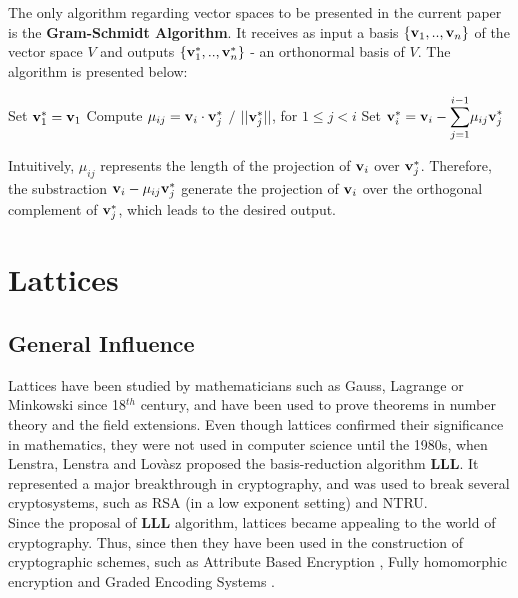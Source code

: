 \begin{enumerate}
	The only algorithm regarding vector spaces to be presented in the current paper is the  \textbf{Gram-Schmidt Algorithm}. It receives as input a basis $\{\textbf{v}_1, .., \textbf{v}_n\}$ of the vector space $V$ and outputs $\{\textbf{v}_1^*,..,\textbf{v}_n^*\}$ - an orthonormal basis of $V$. The algorithm is presented below:

\begin{tcolorbox}[colframe=black,colback=white,arc=0pt,outer arc=0pt]
	\begin{algorithmic}[1]
		\State Set $\textbf{v}_1^* = \textbf{v}_1$
		\State Compute $\mu_{ij} = \textbf{v}_i \cdot \textbf{v}_j^*$ $/$ $ ||\textbf{v}_j^*||$,  for $1 \leq j < i$
		\State Set $\textbf{v}_i^* = \textbf{v}_i - \displaystyle{\sum_{j = 1}^{i-1}} \mu_{ij} \textbf{v}_j^* $
		\EndFor
	\end{algorithmic}
\end{tcolorbox}

	Intuitively, $\mu_{ij}$ represents the length of the projection of $\textbf{v}_i$ over $\textbf{v}_j^*$. Therefore, the substraction $\textbf{v}_i - \mu_{ij} \textbf{v}_j^*$ generate the projection of $\textbf{v}_i$ over the orthogonal complement of $\textbf{v}_j^*$, which leads to the desired output. 
\end{enumerate}	

\section{Lattices}

\subsection{General Influence}

Lattices have been studied by mathematicians such as Gauss, Lagrange or Minkowski since 18$^{th}$ century, and have been used to prove theorems in number theory and the field extensions. Even though lattices confirmed their significance in mathematics, they were not used in computer science until the 1980s, when Lenstra, Lenstra and Lov\`{a}sz proposed the basis-reduction algorithm \textbf{LLL}. It represented a major breakthrough in cryptography, and was used to break several cryptosystems, such as RSA (in a low exponent setting) and NTRU. \\

Since the proposal of \textbf{LLL} algorithm, lattices became appealing to the world of cryptography. Thus, since then they have been used in the construction of cryptographic schemes, such as Attribute Based Encryption \cite{Boy13}, Fully homomorphic encryption \cite{Gen09} and Graded Encoding Systems \cite{GGH13}.

